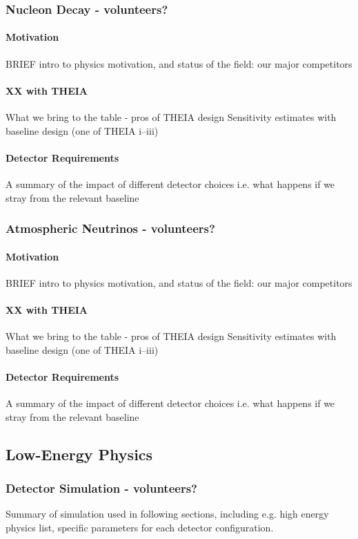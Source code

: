 \documentclass[11pt,prd,letterpaper,amsmath,amssymb,final,nofootinbib
,unsortedaddress,superscriptaddress
]{revtex4-1}
\begin{document}


\subsubsection{Nucleon Decay - \bf volunteers?}
\paragraph{Motivation}
BRIEF intro to physics motivation, and status of the field: our major competitors
\paragraph{XX with THEIA}
What we bring to the table - pros of THEIA design \newline
Sensitivity estimates with baseline design (one of THEIA i--iii)
\paragraph{Detector Requirements}
A summary of the impact of different detector choices i.e. what happens if we stray from the relevant baseline
\subsubsection{Atmospheric Neutrinos - \bf volunteers?}
\paragraph{Motivation}
BRIEF intro to physics motivation, and status of the field: our major competitors
\paragraph{XX with THEIA}
What we bring to the table - pros of THEIA design \newline
Sensitivity estimates with baseline design (one of THEIA i--iii)
\paragraph{Detector Requirements}
A summary of the impact of different detector choices i.e. what happens if we stray from the relevant baseline

\subsection{Low-Energy Physics}
\subsubsection{Detector Simulation - \bf volunteers?}
Summary of simulation used in following sections, including e.g. high energy physics list, specific parameters for each detector configuration.
\end{document}
